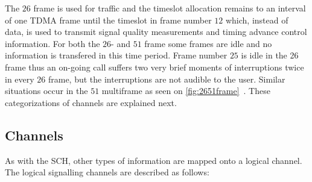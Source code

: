The $26$ frame is used for traffic and the timeslot allocation remains
to an interval of one \gls{TDMA} frame until the timeslot in frame number
$12$ which, instead of data, is used to transmit signal quality
measurements and timing advance control information. For both the
$26$- and $51$ frame some frames are idle and no information is
transfered in this time period. Frame number $25$ is idle in the 26
frame thus an on-going call suffers two very brief moments of
interruptions twice in every $26$ frame, but the interruptions are not
audible to the user. Similar situations occur in the $51$ multiframe
as seen on \cref{fig:2651frame}~\cite[p. 26--28]{gsmtolte}. These
categorizations of channels are explained next.

\subsection{Channels}
As with the \gls{SCH}, other types of information are mapped onto a
logical channel. The logical signalling channels are described as
follows\cite[p. 26--29]{gsmtolte}:

